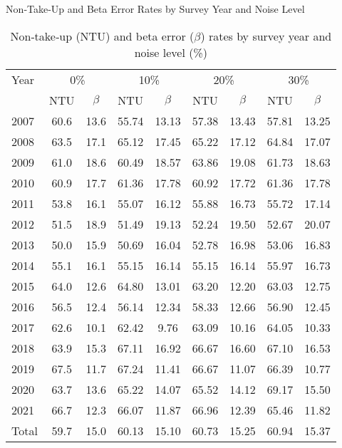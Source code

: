 \begin{table}[htbp]
\setlength{\tabcolsep}{10pt}
\small
\centering
\caption*{Non‑Take‑Up and Beta Error Rates by Survey Year and Noise Level}
\begin{tabular}{l|cc|cc|cc|cc}
\toprule
Year 
  & \multicolumn{2}{c|}{0\%} 
  & \multicolumn{2}{c|}{10\%} 
  & \multicolumn{2}{c|}{20\%} 
  & \multicolumn{2}{c}{30\%} \\
     & NTU & $\beta$ 
     & NTU & $\beta$ 
     & NTU & $\beta$ 
     & NTU & $\beta$ \\
\midrule
2007 & 60.6 & 13.6 & 55.74 & 13.13 & 57.38 & 13.43 & 57.81 & 13.25 \\
2008 & 63.5 & 17.1 & 65.12 & 17.45 & 65.22 & 17.12 & 64.84 & 17.07 \\
2009 & 61.0 & 18.6 & 60.49 & 18.57 & 63.86 & 19.08 & 61.73 & 18.63 \\
2010 & 60.9 & 17.7 & 61.36 & 17.78 & 60.92 & 17.72 & 61.36 & 17.78 \\
2011 & 53.8 & 16.1 & 55.07 & 16.12 & 55.88 & 16.73 & 55.72 & 17.14 \\
2012 & 51.5 & 18.9 & 51.49 & 19.13 & 52.24 & 19.50 & 52.67 & 20.07 \\
2013 & 50.0 & 15.9 & 50.69 & 16.04 & 52.78 & 16.98 & 53.06 & 16.83 \\
2014 & 55.1 & 16.1 & 55.15 & 16.14 & 55.15 & 16.14 & 55.97 & 16.73 \\
2015 & 64.0 & 12.6 & 64.80 & 13.01 & 63.20 & 12.20 & 63.03 & 12.75 \\
2016 & 56.5 & 12.4 & 56.14 & 12.34 & 58.33 & 12.66 & 56.90 & 12.45 \\
2017 & 62.6 & 10.1 & 62.42 & 9.76  & 63.09 & 10.16 & 64.05 & 10.33 \\
2018 & 63.9 & 15.3 & 67.11 & 16.92 & 66.67 & 16.60 & 67.10 & 16.53 \\
2019 & 67.5 & 11.7 & 67.24 & 11.41 & 66.67 & 11.07 & 66.39 & 10.77 \\
2020 & 63.7 & 13.6 & 65.22 & 14.07 & 65.52 & 14.12 & 69.17 & 15.50 \\
2021 & 66.7 & 12.3 & 66.07 & 11.87 & 66.96 & 12.39 & 65.46 & 11.82 \\
\midrule
Total
     & 59.7 & 15.0 & 60.13 & 15.10 & 60.73 & 15.25 & 60.94 & 15.37 \\
\bottomrule
\end{tabular}
\caption{\small{Non‑take‑up (NTU) and beta error ($\beta$) rates by survey year and noise level (\%)}}
\label{tab:conditional_probs_noise}
\end{table}
